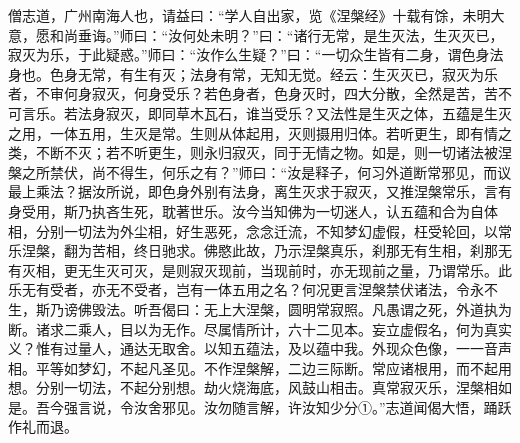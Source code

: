 \documentclass[12pt,twoside,openany]{book}
\begin{document}
僧志道，广州南海人也，请益曰：“学人自出家，览《涅槃经》十载有馀，未明大意，愿和尚垂诲。”师曰：“汝何处未明？”曰：“诸行无常，是生灭法，生灭灭已，寂灭为乐，于此疑惑。”师曰：“汝作么生疑？”曰：“一切众生皆有二身，谓色身法身也。色身无常，有生有灭；法身有常，无知无觉。经云：生灭灭已，寂灭为乐者，不审何身寂灭，何身受乐？若色身者，色身灭时，四大分散，全然是苦，苦不可言乐。若法身寂灭，即同草木瓦石，谁当受乐？又法性是生灭之体，五蕴是生灭之用，一体五用，生灭是常。生则从体起用，灭则摄用归体。若听更生，即有情之类，不断不灭；若不听更生，则永归寂灭，同于无情之物。如是，则一切诸法被涅槃之所禁伏，尚不得生，何乐之有？”师曰：“汝是释子，何习外道断常邪见，而议最上乘法？据汝所说，即色身外别有法身，离生灭求于寂灭，又推涅槃常乐，言有身受用，斯乃执吝生死，耽著世乐。汝今当知佛为一切迷人，认五蕴和合为自体相，分别一切法为外尘相，好生恶死，念念迁流，不知梦幻虚假，枉受轮回，以常乐涅槃，翻为苦相，终日驰求。佛愍此故，乃示涅槃真乐，刹那无有生相，刹那无有灭相，更无生灭可灭，是则寂灭现前，当现前时，亦无现前之量，乃谓常乐。此乐无有受者，亦无不受者，岂有一体五用之名？何况更言涅槃禁伏诸法，令永不生，斯乃谤佛毁法。听吾偈曰：无上大涅槃，圆明常寂照。凡愚谓之死，外道执为断。诸求二乘人，目以为无作。尽属情所计，六十二见本。妄立虚假名，何为真实义？惟有过量人，通达无取舍。以知五蕴法，及以蕴中我。外现众色像，一一音声相。平等如梦幻，不起凡圣见。不作涅槃解，二边三际断。常应诸根用，而不起用想。分别一切法，不起分别想。劫火烧海底，风鼓山相击。真常寂灭乐，涅槃相如是。吾今强言说，令汝舍邪见。汝勿随言解，许汝知少分①。”志道闻偈大悟，踊跃作礼而退。
\end{document}
